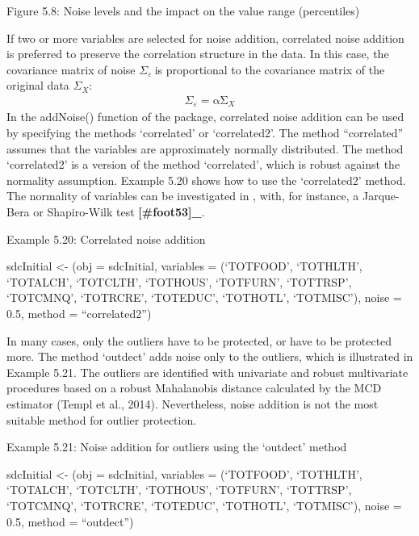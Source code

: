 \documentclass[letterpaper,10pt,english]{sphinxmanual}
\begin{document}
\noindent{}

Figure 5.8: Noise levels and the impact on the value range (percentiles)

If two or more variables are selected for noise addition, correlated
noise addition is preferred to preserve the correlation structure in the
data. In this case, the covariance matrix of noise
\(\Sigma_{\varepsilon}\ \)is proportional to the covariance matrix
of the original data \(\Sigma_{X}:\)
\begin{equation*}
\begin{split}\Sigma_{\varepsilon} = \text{αΣ}_{X}\end{split}
\end{equation*}
In the addNoise() function of the  package, correlated noise
addition can be used by specifying the methods ‘correlated’ or
‘correlated2’. The method “correlated” assumes that the variables are
approximately normally distributed. The method ‘correlated2’ is a
version of the method ‘correlated’, which is robust against the
normality assumption. Example 5.20 shows how to use the ‘correlated2’
method. The normality of variables can be investigated in , with, for
instance, a Jarque-Bera or Shapiro-Wilk test {\color{red}\bfseries{}{[}\#foot53{]}\_}.

Example 5.20: Correlated noise addition

sdcInitial \textless{}- (obj = sdcInitial, variables =
(‘TOTFOOD’, ‘TOTHLTH’, ‘TOTALCH’, ‘TOTCLTH’, ‘TOTHOUS’,
‘TOTFURN’, ‘TOTTRSP’, ‘TOTCMNQ’, ‘TOTRCRE’, ‘TOTEDUC’, ‘TOTHOTL’,
‘TOTMISC’), noise = 0.5, method = “correlated2”)

In many cases, only the outliers have to be protected, or have to be
protected more. The method ‘outdect’ adds noise only to the outliers,
which is illustrated in Example 5.21. The outliers are identified with
univariate and robust multivariate procedures based on a robust
Mahalanobis distance calculated by the MCD estimator (Templ et al.,
2014). Nevertheless, noise addition is not the most suitable method for
outlier protection.

Example 5.21: Noise addition for outliers using the ‘outdect’ method

sdcInitial \textless{}- (obj = sdcInitial, variables =
(‘TOTFOOD’, ‘TOTHLTH’, ‘TOTALCH’, ‘TOTCLTH’, ‘TOTHOUS’,
‘TOTFURN’, ‘TOTTRSP’, ‘TOTCMNQ’, ‘TOTRCRE’, ‘TOTEDUC’, ‘TOTHOTL’,
‘TOTMISC’), noise = 0.5, method = “outdect”)
\end{document}
